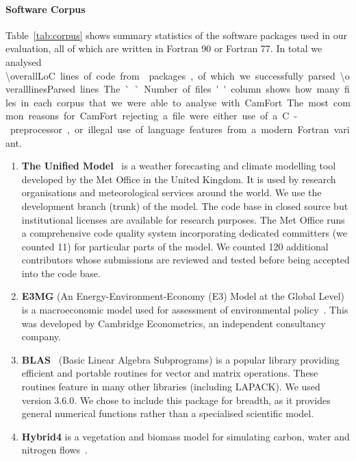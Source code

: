 \paragraph{Software Corpus}
Table~\ref{tab:corpus} shows summary statistics of the software
packages used in our evaluation, all of which are written in Fortran
90 or Fortran 77. In total we analysed \SI{\overallLoC} lines of code
from \numPackages{} packages, of which we successfully parsed
\SI{\overalllinesParsed} lines. The ``Number of files'' column shows
how many files in each corpus that we were able to analyse with
CamFort. The most common reasons for CamFort rejecting a file were
either use of a C-preprocessor, or illegal use of language features
from a modern Fortran variant.

\begin{enumerate}
\item \textbf{The Unified Model}~\cite{um} is a weather
  forecasting and climate modelling tool developed by the Met Office
  in the United Kingdom. It is used by research organisations and
  meteorological services around the world. We use the development
  branch (trunk) of the model. The code base in closed source but
  institutional licenses are available for research purposes. The Met
  Office runs a comprehensive code quality system incorporating
  dedicated committers (we counted 11) for particular parts of the
  model. We counted 120 additional contributors whose submissions are
  reviewed and tested before being accepted into the code base.

\item \textbf{E3MG} (An Energy-Environment-Economy (E3) Model at the Global
Level) is a macroeconomic model used for assessment of environmental
policy~\cite{RePEc:aen:journl:2006se-a12}. This was developed by
Cambridge Econometrics, an independent consultancy company.

\item \textbf{BLAS}~\cite{blas} (Basic Linear Algebra Subprograms) is
  a popular library providing efficient and portable routines for
  vector and matrix operations. These routines feature in many other
  libraries (including LAPACK). We used version 3.6.0. We chose to
  include this package for breadth, as it provides general numerical
  functions rather than a specialised scientific model.

\item \textbf{Hybrid4} is a vegetation and biomass model for
  simulating carbon, water and nitrogen flows~\cite{GBC:GBC635}.


\end{enumerate}
